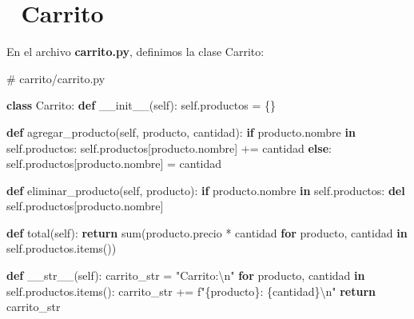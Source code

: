 \documentclass[
  a4paper,
  DIV=11,
  numbers=noendperiod,
  onepage,
  openany]{scrreprt}
\newenvironment{Shaded}{\begin{snugshade}}{\end{snugshade}}
\newcommand{\BuiltInTok}[1]{\textcolor[rgb]{0.00,0.23,0.31}{#1}}
\newcommand{\CharTok}[1]{\textcolor[rgb]{0.13,0.47,0.30}{#1}}
\newcommand{\CommentTok}[1]{\textcolor[rgb]{0.37,0.37,0.37}{#1}}
\newcommand{\ControlFlowTok}[1]{\textcolor[rgb]{0.00,0.23,0.31}{\textbf{#1}}}
\newcommand{\FunctionTok}[1]{\textcolor[rgb]{0.28,0.35,0.67}{#1}}
\newcommand{\KeywordTok}[1]{\textcolor[rgb]{0.00,0.23,0.31}{\textbf{#1}}}
\newcommand{\NormalTok}[1]{\textcolor[rgb]{0.00,0.23,0.31}{#1}}
\newcommand{\OperatorTok}[1]{\textcolor[rgb]{0.37,0.37,0.37}{#1}}
\newcommand{\SpecialCharTok}[1]{\textcolor[rgb]{0.37,0.37,0.37}{#1}}
\newcommand{\SpecialStringTok}[1]{\textcolor[rgb]{0.13,0.47,0.30}{#1}}
\newcommand{\StringTok}[1]{\textcolor[rgb]{0.13,0.47,0.30}{#1}}
\newcommand{\VariableTok}[1]{\textcolor[rgb]{0.07,0.07,0.07}{#1}}
\begin{document}
\section{🛒 Carrito}\label{carrito}

En el archivo \textbf{carrito.py}, definimos la clase Carrito:

\begin{Shaded}
\begin{Highlighting}[]
\CommentTok{\# carrito/carrito.py}

\KeywordTok{class}\NormalTok{ Carrito:}
    \KeywordTok{def} \FunctionTok{\_\_init\_\_}\NormalTok{(}\VariableTok{self}\NormalTok{):}
        \VariableTok{self}\NormalTok{.productos }\OperatorTok{=}\NormalTok{ \{\}}

    \KeywordTok{def}\NormalTok{ agregar\_producto(}\VariableTok{self}\NormalTok{, producto, cantidad):}
        \ControlFlowTok{if}\NormalTok{ producto.nombre }\KeywordTok{in} \VariableTok{self}\NormalTok{.productos:}
            \VariableTok{self}\NormalTok{.productos[producto.nombre] }\OperatorTok{+=}\NormalTok{ cantidad}
        \ControlFlowTok{else}\NormalTok{:}
            \VariableTok{self}\NormalTok{.productos[producto.nombre] }\OperatorTok{=}\NormalTok{ cantidad}

    \KeywordTok{def}\NormalTok{ eliminar\_producto(}\VariableTok{self}\NormalTok{, producto):}
        \ControlFlowTok{if}\NormalTok{ producto.nombre }\KeywordTok{in} \VariableTok{self}\NormalTok{.productos:}
            \KeywordTok{del} \VariableTok{self}\NormalTok{.productos[producto.nombre]}

    \KeywordTok{def}\NormalTok{ total(}\VariableTok{self}\NormalTok{):}
        \ControlFlowTok{return} \BuiltInTok{sum}\NormalTok{(producto.precio }\OperatorTok{*}\NormalTok{ cantidad }\ControlFlowTok{for}\NormalTok{ producto, cantidad }\KeywordTok{in} \VariableTok{self}\NormalTok{.productos.items())}

    \KeywordTok{def} \FunctionTok{\_\_str\_\_}\NormalTok{(}\VariableTok{self}\NormalTok{):}
\NormalTok{        carrito\_str }\OperatorTok{=} \StringTok{"Carrito:}\CharTok{\textbackslash{}n}\StringTok{"}
        \ControlFlowTok{for}\NormalTok{ producto, cantidad }\KeywordTok{in} \VariableTok{self}\NormalTok{.productos.items():}
\NormalTok{            carrito\_str }\OperatorTok{+=} \SpecialStringTok{f"}\SpecialCharTok{\{}\NormalTok{producto}\SpecialCharTok{\}}\SpecialStringTok{: }\SpecialCharTok{\{}\NormalTok{cantidad}\SpecialCharTok{\}}\CharTok{\textbackslash{}n}\SpecialStringTok{"}
        \ControlFlowTok{return}\NormalTok{ carrito\_str}
\end{Highlighting}
\end{Shaded}
\end{document}
